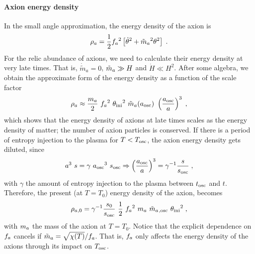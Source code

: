 \documentclass[11pt,a4paper]{article}
\begin{document}
\paragraph{Axion energy density}
%
In the small angle approximation, the energy density of the axion is 
%
\begin{eqnarray}
	\rho_{a} = \dfrac{1}{2} f_{a}{}^2 \left[  \dot{\theta}^2 + \tilde m_{a}{}^2 \theta^2  \right] \;.
	\label{eq:rho_a_def} 
\end{eqnarray}
%
For the relic abundance of axions, we need to calculate their energy density at very late times. That is, $\dot{\tilde{m}}_a = 0$, $\tilde m_{a}{} \gg H$ and $\dot H \ll H^2$. After some algebra, we obtain the approximate form of the energy density as a function of the scale factor 
%
\begin{eqnarray}
	\rho_{a} \approx \dfrac{m_{a}{} }{2}  \ f_{a}{}^2 \ \theta_{\rm ini}{}^2  \ \tilde m_{a}{}(a_{\rm osc}{}) \ \left( \dfrac{a_{\rm osc}{}}{a} \right)^3 \;,
	\label{eq:rho_a0} 
\end{eqnarray}
%
which shows that the energy density of axions at late times scales as the energy density of matter; \ie the number of axion particles is conserved. If there is a period of entropy injection to the plasma for $T<T_{\rm osc}{}$, the axion energy density gets diluted, since 
%
\begin{equation}
	a^3 \ s = \gamma \ a_{\rm osc}{}^3 \ s_{\rm osc} \Rightarrow  \left( \dfrac{a_{\rm osc}{}}{a} \right)^3 = \gamma^{-1} \dfrac{s}{s_{\rm osc}} \;,
	\label{eq:WKB_gamma_def}
\end{equation}
%
with $\gamma$ the amount of entropy injection to the plasma between $t_{\rm osc}{}$ and $t$. Therefore, the present (at $T=T_0$) energy density of the axion, becomes
%
\begin{eqnarray}
	\rho_{a,0} = \gamma^{-1}  \dfrac{s_0}{s_{\rm osc}} \  \dfrac{1 }{2}  \ f_{a}{}^2 \ m_{a}{} \ \tilde m_{a}{}_{,{\rm osc}} \ \theta_{\rm ini}{}^2    \;,
	\label{eq:rho_a_approx} 
\end{eqnarray}
with $m_{a}{}$ the mass of the axion at $T=T_0$. Notice that the explicit dependence on $f_{a}{}$ cancels if $\tilde m_{a}{}=\sqrt{\chi(T)}/f_{a}{}$. That is, $f_{a}{}$ only affects the energy density of the axions through its impact on $T_{\rm osc}{}$. 
%
\end{document}
